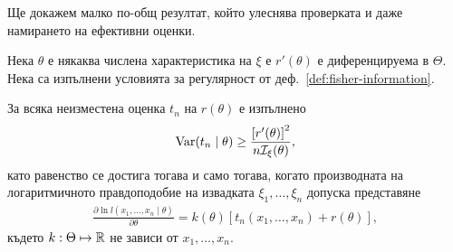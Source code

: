 \documentclass[numbers=endperiod, bibliography=totocnumbered]{scrartcl}
\begin{document}
Ще докажем малко по-общ резултат, който улеснява проверката и даже намирането на ефективни оценки.
\begin{theorem}\label{thm:rao-cramer}
  Нека \( \theta \) е някаква числена характеристика на \( \xi \) е \( r'(\theta) \) е диференцируема в \( \Theta \). Нека са изпълнени условията за регулярност от деф.~\ref{def:fisher-information}.

  За всяка неизместена оценка \( t_n \) на \( r(\theta) \) е изпълнено
  \begin{align*}
    \operatorname{Var}(t_n \mid \theta) \geq \frac {{\left[r'(\theta) \right]}^2} {n \mathcal{I}_\xi(\theta)},
  \end{align*}
  като равенство се достига тогава и само тогава, когато производната на логаритмичното правдоподобие на извадката \( \xi_1, \ldots, \xi_n \) допуска представяне
  \begin{align*}
    \frac {\partial \ln l(x_1, \ldots, x_n \mid \theta)} {\partial \theta}
    =
    k(\theta) [t_n(x_1, \ldots, x_n) + r(\theta)],
  \end{align*}
  където \( k: \Theta \mapsto \mathbb{R} \) не зависи от \( x_1, \ldots, x_n \).
\end{theorem}
\end{document}
